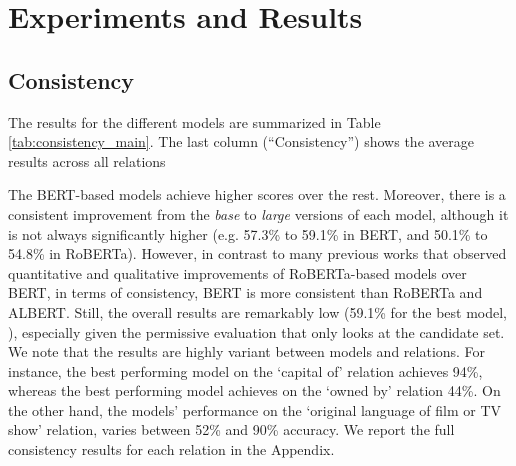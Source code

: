 \section{Experiments and Results}
\label{sec:experiments}






\subsection{Consistency}

The results for the different models are summarized in Table \ref{tab:consistency_main}.
The last column (``Consistency'') shows the average results across all relations 

The BERT-based models achieve higher scores over the rest. Moreover, there is a consistent improvement from the \textit{base} to \textit{large} versions of each model, although it is not always significantly  higher (e.g. 57.3\% to 59.1\% in BERT, and 50.1\% to 54.8\% in RoBERTa).
However, in contrast to many previous works that observed quantitative and qualitative improvements of RoBERTa-based models over BERT, in terms of consistency, BERT is more consistent than RoBERTa and ALBERT.
Still, the overall results are remarkably low (59.1\% for the best model, ), especially given the permissive evaluation that only looks at the candidate set.
We note that the results are highly variant between models and relations. For instance, the best performing model on the `capital of' relation achieves 94\%, whereas the best performing model achieves on the `owned by' relation 44\%. 
On the other hand, the models' performance on the `original language of film or TV show' relation, varies between 52\% and 90\% accuracy.
We report the full consistency results for each relation in the Appendix.




